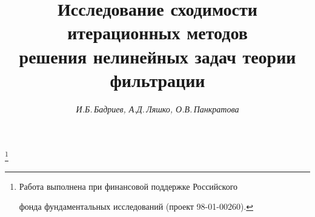 




% 


\newcommand{\Div}{\operatorname{div}}


\newcommand{\tts}[1]{}







 


\setcounter{page}{8}












\author{\it И.Б.\,Бадриев, А.Д.\,Ляшко, О.В.\,Панкратова }




\title{Исследование сходимости итерационных методов\\


решения нелинейных задач теории фильтрации}





\thanks{Работа выполнена при финансовой поддержке Российского


фонда фундаментальных исследований (проект 98-01-00260).}


\date{}







\pagestyle{plain} %













